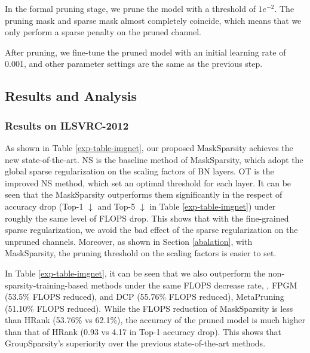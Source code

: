 \documentclass[review]{cvpr}
\begin{document}
In the formal pruning stage, we prune the model with a threshold of $1e^{-2}$. The pruning mask and sparse mask almost completely coincide,  which means that we only perform a sparse penalty on the pruned channel.

After pruning, we fine-tune the pruned model with an initial learning rate of 0.001, and
other parameter settings are the same as the previous step.



\subsection{Results and Analysis}

\subsubsection{Results on ILSVRC-2012}\label{results_on_ILSVRC-2012}
As shown in Table \ref{exp-table-imgnet}, our proposed MaskSparsity achieves the new state-of-the-art. NS \cite{liu2017learning} is the baseline method of MaskSparsity, which adopt the global sparse regularization on the scaling factors of BN layers. OT \cite{OT} is the improved NS method, which set an optimal threshold for each layer. It can be seen that the MaskSparsity outperforms them significantly in the respect of accuracy drop (Top-1 $\downarrow$  and Top-5 $\downarrow$  in Table \ref{exp-table-imgnet}) under roughly the same level of FLOPS drop. This shows that with the fine-grained sparse regularization, we avoid the bad effect of the sparse regularization on the unpruned channels. Moreover, as shown in Section \ref{abalation}, with MaskSparsity, the pruning threshold on the scaling factors is easier to set.

In Table \ref{exp-table-imgnet}, it can be seen that we also outperform the non-sparsity-training-based methods under the same FLOPS decrease rate, \eg, FPGM \cite{FPGM} (53.5\% FLOPS reduced), and DCP \cite{zhuang2018discrimination} (55.76\% FLOPS reduced), MetaPruning \cite{Metapruning} (51.10\% FLOPS reduced). While the FLOPS reduction of MaskSparsity is less than HRank (53.76\% vs 62.1\%), the accuracy of the pruned model is much higher than that of HRank (0.93 vs 4.17 in Top-1 accuracy drop).
This shows that GroupSparsity's superiority over the previous state-of-the-art methods.
 
\end{document}
